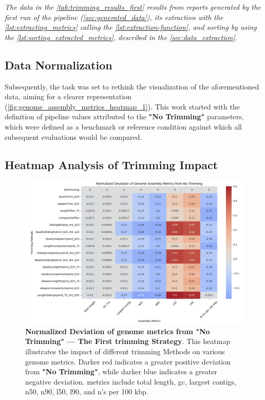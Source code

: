 \textit{The data in the \autoref{tab:trimming_results_first} results from reports generated by the first run of the pipeline (\autoref{sec:generated_data}), its extraction with the \autoref{lst:extracting_metrics} calling the \autoref{lst:extraction-function}, and sorting by using the \autoref{lst:sorting_extracted_metrics}, described in the  \autoref{sec:data_extraction}.}


\subsection{Data Normalization}

Subsequently, the task was set to rethink the visualization of the aforementioned data, aiming for a clearer representation (\autoref{fig:genome_assembly_metrics_heatmap_1}). This work started with the definition of pipeline values attributed to the \textbf{"No Trimming"} parameters, which were defined as a benchmark or reference condition against which all subsequent evaluations would be compared.

\subsection{Heatmap Analysis of Trimming Impact} 


\begin{figure}[H]
\centering
\includegraphics[width=\linewidth]{resources/images/genome_assembly_metrics_heatmap_1.png}
\caption{\textbf{Normalized Deviation of \gls{genome} \gls{metrics} from "No Trimming" — The First \gls{trimming} Strategy}. This \gls{heatmap} illustrates the impact of different \gls{trimming} Methods on various \gls{genome} \gls{metrics}. Darker red indicates a greater positive deviation from \textbf{"No Trimming"}, while darker blue indicates a greater negative deviation. \gls{metrics} include \gls{total length}, \gls{gc}, \gls{largest contigs}, \gls{n50}, \gls{n90}, \gls{l50}, \gls{l90}, and \gls{n's per 100 kbp}.}
\label{fig:genome_assembly_metrics_heatmap_1}
\end{figure}

